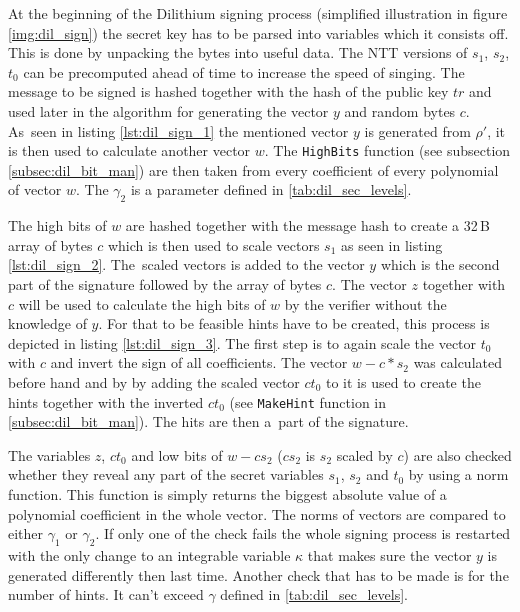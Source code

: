 At the beginning of the Dilithium signing process (simplified illustration in figure \ref{img:dil_sign}) the secret key has to be parsed into variables which it consists off. This is done by unpacking the bytes into useful data. The NTT versions of $s_1$, $s_2$, $t_0$ can be precomputed ahead of time to increase the speed of singing. 
\noindent The message to be signed is hashed together with the hash of the public key $tr$ and used later in the algorithm for generating the vector $y$ and random bytes $c$. As~seen in listing \ref{lst:dil_sign_1} the mentioned vector $y$ is generated from $\rho'$, it is then used to calculate another vector $w$. The \texttt{HighBits} function (see subsection \ref{subsec:dil_bit_man}) are then taken from every coefficient of every polynomial of vector $w$. The $\gamma_2$ is a parameter defined in \ref{tab:dil_sec_levels}.

The high bits of $w$ are hashed together with the message hash to create a 32\,B array of bytes $c$ which is then used to scale vectors $s_1$ as seen in listing \ref{lst:dil_sign_2}. The~scaled vectors is added to the vector $y$ which is the second part of the signature followed by the array of bytes $c$. 
The vector $z$ together with $c$ will be used to calculate the high bits of $w$ by the verifier without the knowledge of $y$. For that to be feasible hints have to be created, this process is depicted in listing \ref{lst:dil_sign_3}. The first step is to again scale the vector $t_0$ with $c$ and invert the sign of all coefficients. The vector $w-c*s_2$ was calculated before hand and by by adding the scaled vector $ct_0$ to it is used to create the hints together with the inverted $ct_0$ (see \texttt{MakeHint} function in \ref{subsec:dil_bit_man}). The hits are then a~part of the signature.
\newpage 
{}

The variables $z$, $ct_0$ and low bits of $w-cs_2$ ($cs_2$ is $s_2$ scaled by $c$) are also checked whether they reveal any part of the secret variables $s_1$, $s_2$ and $t_0$ by using a norm function. This function is simply returns the biggest absolute value of a polynomial coefficient in the whole vector. The norms of vectors are compared to either $\gamma_1$ or $\gamma_2$. If only one of the check fails the whole signing process is restarted with the only change to an integrable variable $\kappa$ that makes sure the vector $y$ is generated differently then last time. Another check that has to be made is for the number of hints. It can't exceed $\gamma$ defined in \ref{tab:dil_sec_levels}.

